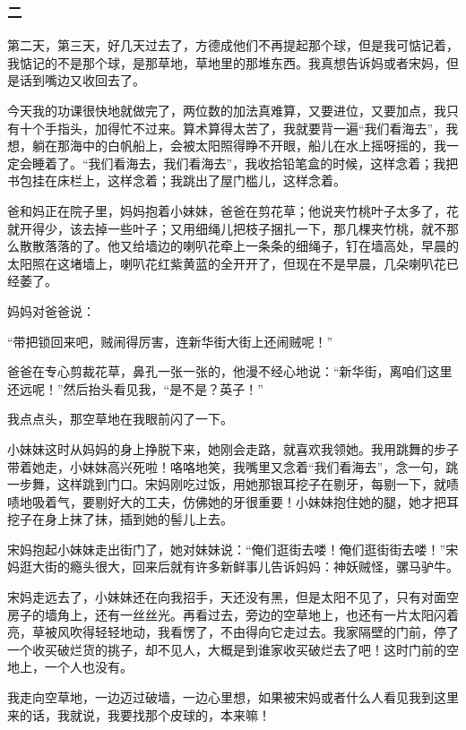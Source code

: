 \subsubsection*{二}

\par 第二天，第三天，好几天过去了，方德成他们不再提起那个球，但是我可惦记着，我惦记的不是那个球，是那草地，草地里的那堆东西。我真想告诉妈或者宋妈，但是话到嘴边又收回去了。
\par 今天我的功课很快地就做完了，两位数的加法真难算，又要进位，又要加点，我只有十个手指头，加得忙不过来。算术算得太苦了，我就要背一遍“我们看海去”，我想，躺在那海中的白帆船上，会被太阳照得睁不开眼，船儿在水上摇呀摇的，我一定会睡着了。“我们看海去，我们看海去”，我收拾铅笔盒的时候，这样念着；我把书包挂在床栏上，这样念着；我跳出了屋门槛儿，这样念着。
\par 爸和妈正在院子里，妈妈抱着小妹妹，爸爸在剪花草；他说夹竹桃叶子太多了，花就开得少，该去掉一些叶子；又用细绳儿把枝子捆扎一下，那几棵夹竹桃，就不那么散散落落的了。他又给墙边的喇叭花牵上一条条的细绳子，钉在墙高处，早晨的太阳照在这堵墙上，喇叭花红紫黄蓝的全开开了，但现在不是早晨，几朵喇叭花已经萎了。
\par 妈妈对爸爸说：
\par “带把锁回来吧，贼闹得厉害，连新华街大街上还闹贼呢！”
\par 爸爸在专心剪裁花草，鼻孔一张一张的，他漫不经心地说：“新华街，离咱们这里还远呢！”然后抬头看见我，“是不是？英子！”
\par 我点点头，那空草地在我眼前闪了一下。
\par 小妹妹这时从妈妈的身上挣脱下来，她刚会走路，就喜欢我领她。我用跳舞的步子带着她走，小妹妹高兴死啦！咯咯地笑，我嘴里又念着“我们看海去”，念一句，跳一步舞，这样跳到门口。宋妈刚吃过饭，用她那银耳挖子在剔牙，每剔一下，就啧啧地吸着气，要剔好大的工夫，仿佛她的牙很重要！小妹妹抱住她的腿，她才把耳挖子在身上抹了抹，插到她的髻儿上去。
\par 宋妈抱起小妹妹走出街门了，她对妹妹说：“俺们逛街去喽！俺们逛街街去喽！”宋妈逛大街的瘾头很大，回来后就有许多新鲜事儿告诉妈妈：神妖贼怪，骡马驴牛。
\par 宋妈走远去了，小妹妹还在向我招手，天还没有黑，但是太阳不见了，只有对面空房子的墙角上，还有一丝丝光。再看过去，旁边的空草地上，也还有一片太阳闪着亮，草被风吹得轻轻地动，我看愣了，不由得向它走过去。我家隔壁的门前，停了一个收买破烂货的挑子，却不见人，大概是到谁家收买破烂去了吧！这时门前的空地上，一个人也没有。
\par 我走向空草地，一边迈过破墙，一边心里想，如果被宋妈或者什么人看见我到这里来的话，我就说，我要找那个皮球的，本来嘛！
